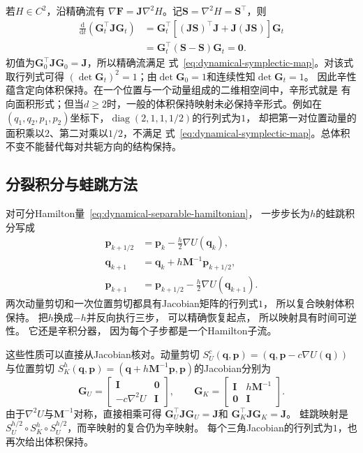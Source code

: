 若$H\in C^2$，沿精确流有
$\nabla\bm{F}=\bm{J}\nabla^2H$。记$\bm{S}=\nabla^2H=\bm{S}^{\top}$，则
\[
	\begin{aligned}
	\frac{\mathrm{d}}{\mathrm{d}t}
	(\bm{G}_t^{\top}\bm{J}\bm{G}_t)
	&=\bm{G}_t^{\top}
	\left[(\bm{J}\bm{S})^{\top}\bm{J}
	+\bm{J}(\bm{J}\bm{S})\right]\bm{G}_t\\
	&=\bm{G}_t^{\top}(\bm{S}-\bm{S})\bm{G}_t=\bm{0}.
	\end{aligned}
\]
初值为$\bm{G}_0^{\top}\bm{J}\bm{G}_0=\bm{J}$，所以精确流满足
式~\eqref{eq:dynamical-symplectic-map}。对该式取行列式可得
$(\det\bm{G}_t)^2=1$；由$\det\bm{G}_0=1$和连续性知$\det\bm{G}_t=1$。
因此辛性蕴含定向体积保持。在一个位置与一个动量组成的二维相空间中，辛形式就是
有向面积形式；但当$d\geq2$时，一般的体积保持映射未必保持辛形式。例如在
$(q_1,q_2,p_1,p_2)$坐标下，$\operatorname{diag}(2,1,1,1/2)$的行列式为$1$，
却把第一对位置动量的面积乘以$2$、第二对乘以$1/2$，不满足
式~\eqref{eq:dynamical-symplectic-map}。总体积不变不能替代每对共轭方向的结构保持。

\subsection{分裂积分与蛙跳方法}

对可分Hamilton量~\eqref{eq:dynamical-separable-hamiltonian}， 一步步长为$h$的蛙跳积分写成
\begin{align}
	\bm{p}_{k+1/2} & = \bm{p}_{k}- \frac{h}{2}\nabla U(\bm{q}_{k}), \label{eq:dynamical-leapfrog-half-momentum}        \\
	\bm{q}_{k+1}   & = \bm{q}_{k}+ h\bm{M}^{-1}\bm{p}_{k+1/2}, \label{eq:dynamical-leapfrog-position}                  \\
	\bm{p}_{k+1}   & = \bm{p}_{k+1/2}- \frac{h}{2}\nabla U(\bm{q}_{k+1}). \label{eq:dynamical-leapfrog-final-momentum}
\end{align}
两次动量剪切和一次位置剪切都具有Jacobian矩阵的行列式$1$， 所以复合映射体积保持。 把$h$换成$-
h$并反向执行三步， 可以精确恢复起点， 所以映射具有时间可逆性。 它还是辛积分器， 因为每个子步都是一个Hamilton子流。

这些性质可以直接从Jacobian核对。动量剪切
$S_U^c(\bm{q},\bm{p})=(\bm{q},\bm{p}-c\nabla U(\bm{q}))$与位置剪切
$S_K^h(\bm{q},\bm{p})=(\bm{q}+h\bm{M}^{-1}\bm{p},\bm{p})$的Jacobian分别为
\[
	\bm{G}_U=
	\begin{bmatrix}
		\bm{I}&\bm{0}\\
		-c\nabla^2U&\bm{I}
	\end{bmatrix},
	\qquad
	\bm{G}_K=
	\begin{bmatrix}
		\bm{I}&h\bm{M}^{-1}\\
		\bm{0}&\bm{I}
	\end{bmatrix}.
\]
由于$\nabla^2U$与$\bm{M}^{-1}$对称，直接相乘可得
$\bm{G}_U^{\top}\bm{J}\bm{G}_U=\bm{J}$和
$\bm{G}_K^{\top}\bm{J}\bm{G}_K=\bm{J}$。
蛙跳映射是$S_U^{h/2}\circ S_K^h\circ S_U^{h/2}$，而辛映射的复合仍为辛映射。
每个三角Jacobian的行列式为$1$，也再次给出体积保持。

